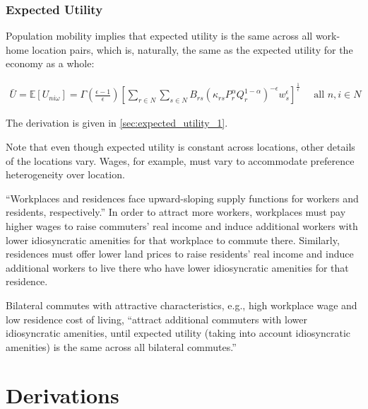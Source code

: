 \documentclass[10pt]{article}
\begin{document}
\subsubsection{Expected Utility}

Population mobility implies 
that expected utility 
is the same across 
all work-home location pairs,
which is, naturally, the same as the expected 
utility for the economy as a whole:

\begin{align}
    \bar{U}=\mathbb{E}\left[U_{n i \omega}\right]=\Gamma\left(\frac{\epsilon-1}{\epsilon}\right)\left[\sum_{r \in N} \sum_{s \in N} B_{r s}\left(\kappa_{r s} P_r^\alpha Q_r^{1-\alpha}\right)^{-\epsilon} w_s^\epsilon\right]^{\frac{1}{\epsilon}} \quad \text { all } n, i \in N \label{eq:expected_utility_1}
\end{align}

The derivation is given in \autoref{sec:expected_utility_1}.

Note that even though expected utility 
is constant across locations, other 
details of the locations vary. 
Wages, for example, must vary to accommodate 
preference heterogeneity over location. 

``Workplaces and residences face upward-sloping supply 
functions for workers and residents, respectively.''
In order to attract more workers, workplaces must pay 
higher wages to raise commuters' real income and
induce additional workers
with lower idiosyncratic amenities for that 
workplace to commute there.
Similarly, residences must offer lower land prices 
to raise residents' real income and induce additional
workers to live there who have lower idiosyncratic amenities
for that residence.

Bilateral commutes with attractive characteristics, 
e.g., high workplace wage and low residence cost of living, 
``attract additional commuters with lower 
idiosyncratic amenities, until expected utility 
(taking into account idiosyncratic amenities) 
is the same across all bilateral commutes.''

\section{Derivations}
\end{document}
